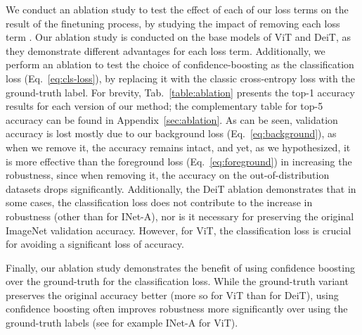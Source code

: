 \documentclass{article}
\begin{document}
We conduct an ablation study to test the effect of each of our loss terms on the result of the finetuning process, by studying the impact of removing each loss term . Our ablation study is conducted on the base models of ViT and DeiT, as they demonstrate different advantages for each loss term. Additionally, we perform an ablation to test the choice of confidence-boosting as the classification loss (Eq.~\ref{eq:cls-loss}), by replacing it with the classic cross-entropy loss with the ground-truth label. For brevity, Tab.~\ref{table:ablation} presents the top-1 accuracy results for each version of our method; the complementary table for top-5 accuracy can be found in Appendix~\ref{sec:ablation}. As can be seen, validation accuracy is lost mostly due to our background loss (Eq.~\ref{eq:background}), as when we remove it, the accuracy remains intact, and yet, as we hypothesized, it is more effective than the foreground loss (Eq.~\ref{eq:foreground}) in increasing the robustness, since when removing it, the accuracy on the out-of-distribution datasets drops significantly. Additionally, the DeiT ablation demonstrates that in some cases, the classification loss does not contribute to the increase in robustness (other than for INet-A), nor is it necessary for preserving the original ImageNet validation accuracy. However, for ViT, the classification loss is crucial for avoiding a significant loss of accuracy.

Finally, our ablation study demonstrates the benefit of using confidence boosting over the ground-truth for the classification loss. While the ground-truth variant preserves the original accuracy better (more so for ViT than for DeiT), using confidence boosting often improves robustness more significantly over using the ground-truth labels (see for example INet-A for ViT).
\end{document}
